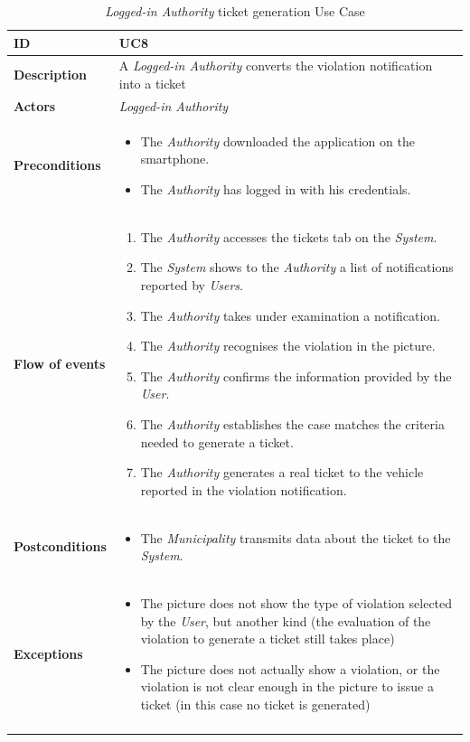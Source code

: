 \documentclass {article}
\begin{document}
		\begin{longtable}{| p{3 cm} | p{10.5 cm} |} 
			\hline
			{\bf ID} & UC8 \\
			\hline
			{\bf Description} & A {\it Logged-in Authority} converts the violation notification into a ticket \\
			\hline
			{\bf Actors} & {\it Logged-in Authority}\\
			\hline
			{\bf Preconditions} & \begin{itemize}
								\item The {\it Authority} downloaded the application on the smartphone.
								  \item The {\it Authority} has logged in with his credentials.
								  \end{itemize}	\\
			\hline
			{\bf Flow of events} &	\begin{enumerate}
								  \item The {\it Authority} accesses the tickets tab on the {\it System}.
								  \item The {\it System} shows to the {\it Authority} a list of notifications reported by {\it Users}.
								  \item The {\it Authority} takes under examination a notification.
								  \item The {\it Authority} recognises the violation in the picture.
								  \item The {\it Authority} confirms the information provided by the {\it User}.
								  \item The {\it Authority} establishes the case matches the criteria needed to generate a ticket.
								  \item The {\it Authority} generates a real ticket to the vehicle reported in the violation notification.
								  \end{enumerate}	\\
			\hline
			{\bf Postconditions} & \begin{itemize}
								  \item The {\it Municipality} transmits data about the ticket to the {\it System}.
								  \end{itemize}	 \\
			\hline
			{\bf Exceptions} & 	\begin{itemize}
								  \item The picture does not show the type of violation selected by the {\it User}, but another kind (the evaluation of the violation to generate a ticket still takes place)
								  \item The picture does not actually show a violation, or the violation is not clear enough in the picture to issue a ticket (in this case no ticket is generated)
								  \end{itemize}	\\
			\hline
			\caption{{\it Logged-in Authority} ticket generation Use Case}
			\end{longtable}
			\pagebreak
			
\end{document}
